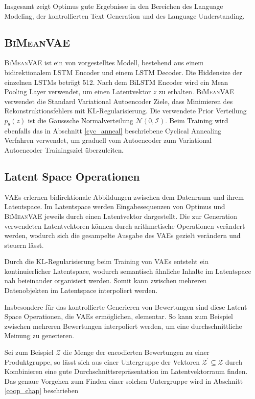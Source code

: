 Insgesamt zeigt Optimus gute Ergebnisse in den Bereichen des Language Modeling, der kontrollierten Text Generation und des Language Understanding.



\pagebreak
\subsection{\textsc{BiMeanVAE}}
\textsc{BiMeanVAE} ist ein von \citep{coop} vorgestelltes Modell, bestehend aus einem bidirektionalem LSTM Encoder und einem LSTM Decoder. 
Die Hiddensize der einzelnen LSTMs beträgt 512. Nach dem BiLSTM Encoder wird ein Mean Pooling Layer verwendet, um einen Latentvektor $z$ zu erhalten.
\textsc{BiMeanVAE} verwendet die Standard Variational Autoencoder Ziele, dass Minimieren des Rekonstruktionsfehlers mit KL-Regularisierung.
Die verwendete Prior Verteilung $p_\theta(z)$ ist die Gausssche Normalverteilung $\mathcal{N}(0,\mathcal{I})$. 
Beim Training wird ebenfalls das in Abschnitt \ref{cyc_anneal} beschriebene Cyclical Annealing Verfahren verwendet, um graduell vom Autoencoder zum Variational Autoencoder Trainingsziel überzuleiten.


\subsection{Latent Space Operationen}
VAEs erlernen bidirektionale Abbildungen zwischen dem Datenraum und ihrem Latentspace. 
Im Latentspace werden Eingabesequenzen von Optimus und \textsc{BiMeanVAE} jeweils durch einen Latentvektor dargestellt.
Die zur Generation verwendeten Latentvektoren können durch arithmetische Operationen verändert werden, wodurch sich die gesampelte Ausgabe des VAEs gezielt verändern und steuern lässt.

Durch die KL-Regularisierung beim Training von VAEs entsteht ein kontinuierlicher Latentspace, wodurch semantisch ähnliche Inhalte im Latentspace nah beieinander organisiert werden.
Somit kann zwischen mehreren Datenobjekten im Latentspace interpoliert werden.

Insbesondere für das kontrollierte Generieren von Bewertungen sind diese Latent Space Operationen, die VAEs ermöglichen, elementar.
So kann zum Beispiel zwischen mehreren Bewertungen interpoliert werden, um eine durchschnittliche Meinung zu generieren.

Sei zum Beispiel $\mathcal{Z}$ die Menge der encodierten Bewertungen zu einer Produktgruppe, so lässt sich aus einer Untergruppe der Vektoren $\mathcal{Z}^{'} \subseteq \mathcal{Z}$ durch Kombinieren eine gute Durchschnittsrepräsentation im Latentvektorraum finden.
Das genaue Vorgehen zum Finden einer solchen Untergruppe wird in Abschnitt \ref{coop_chap} beschrieben
\pagebreak
